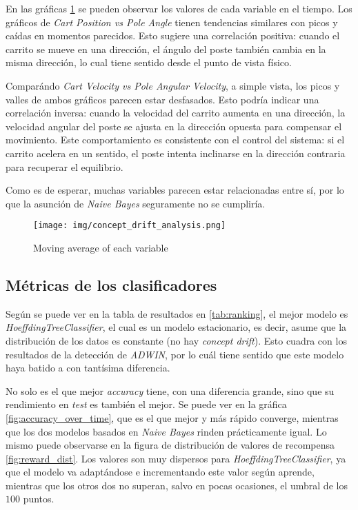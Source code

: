 \documentclass[12pt,letterpaper]{article}
\begin{document}
En las gráficas \ref{fig:concept_drift_analysis} se pueden observar los valores de cada variable en el tiempo. Los gráficos de \textit{Cart Position vs Pole Angle} tienen tendencias similares con picos y caídas en momentos parecidos. Esto sugiere una correlación positiva: cuando el carrito se mueve en una dirección, el ángulo del poste también cambia en la misma dirección, lo cual tiene sentido desde el punto de vista físico.

Comparándo \textit{Cart Velocity vs Pole Angular Velocity}, a simple vista, los picos y valles de ambos gráficos parecen estar desfasados. Esto podría indicar una correlación inversa: cuando la velocidad del carrito aumenta en una dirección, la velocidad angular del poste se ajusta en la dirección opuesta para compensar el movimiento. Este comportamiento es consistente con el control del sistema: si el carrito acelera en un sentido, el poste intenta inclinarse en la dirección contraria para recuperar el equilibrio.

Como es de esperar, muchas variables parecen estar relacionadas entre sí, por lo que la asunción de \textit{Naive Bayes} seguramente no se cumpliría.

\begin{figure}[htp]
    \centering
    \texttt{[image: img/concept\_drift\_analysis.png]}
    \caption{Moving average of each variable}
    \label{fig:concept_drift_analysis}
\end{figure}

\subsection{Métricas de los clasificadores}

Según se puede ver en la tabla de resultados en \ref{tab:ranking}, el mejor modelo es \textit{HoeffdingTreeClassifier}, el cual es un modelo estacionario, es decir, asume que la distribución de los datos es constante (no hay \textit{concept drift}). Esto cuadra con los resultados de la detección de \textit{ADWIN}, por lo cuál tiene sentido que este modelo haya batido a  con tantísima diferencia.

No solo es el que mejor \textit{accuracy} tiene, con una diferencia grande, sino que su rendimiento en \textit{test} es también el mejor. Se puede ver en la gráfica \ref{fig:accuracy_over_time}, que es el que mejor y más rápido converge, mientras que los dos modelos basados en \textit{Naive Bayes} rinden prácticamente igual. Lo mismo puede observarse en la figura de distribución de valores de recompensa \ref{fig:reward_dist}. Los valores son muy dispersos para \textit{HoeffdingTreeClassifier}, ya que el modelo va adaptándose e incrementando este valor según aprende, mientras que los otros dos no superan, salvo en pocas ocasiones, el umbral de los $100$ puntos.
\end{document}
